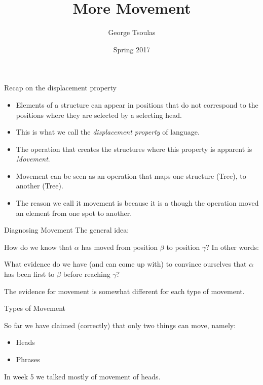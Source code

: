 


\title{More Movement}
\date{Spring 2017}
\author{George Tsoulas}


\maketitle

 \begin{frame}
   {Recap on the displacement property}

   \begin{itemize}
   \item Elements of a structure can appear in positions that do not correspond to the positions where they are selected by a selecting head.
\item This is what we call the \textit{displacement property} of language.
\item The operation that creates the structures where this property is apparent is \textit{Movement}.
\item Movement can be seen as an operation that maps one structure (Tree), to another (Tree).
\item The reason we call it movement is because it is a though the operation moved an element from one spot to another.  
   \end{itemize}
 \end{frame}



 \begin{frame}
   {Diagnosing Movement}
The general idea:

How do we know that $\alpha$ has moved from position $\beta$ to position $\gamma$?  \pause In other words: \pause

What evidence do we have (and can come up with) to convince ourselves that $\alpha$ has been first to $\beta$ before reaching $\gamma$? \pause

The evidence for movement is somewhat different for each type of movement. 


 \end{frame}



 \begin{frame}
{Types of Movement}

So far we have claimed (correctly) that only two things can move, namely:

\pause

\begin{itemize}
\item Heads
\item Phrases
\end{itemize}

In week 5 we talked mostly of movement of heads.
   
\end{frame}

